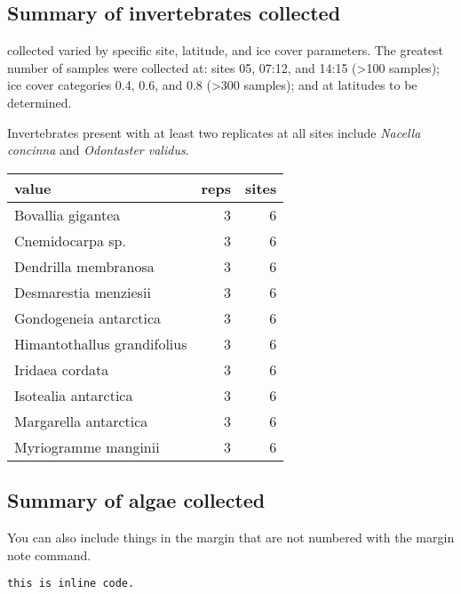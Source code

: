 \documentclass[]{tufte-handout}
\begin{document}
\hypertarget{summary-of-invertebrates-collected}{%
\subsection{Summary of invertebrates
collected}\label{summary-of-invertebrates-collected}}

 collected varied by specific site,
latitude, and ice cover parameters. The greatest number of samples were
collected at: sites 05, 07:12, and 14:15 (\textgreater{}100 samples);
ice cover categories 0.4, 0.6, and 0.8 (\textgreater{}300 samples); and
at latitudes to be determined.

Invertebrates present with at least two replicates at all sites include
\emph{Nacella concinna} and \emph{Odontaster validus}.

\begin{table}[H]
\centering
\begin{tabular}{l|r|r}
\hline
value & reps & sites\\
\hline
Bovallia gigantea & 3 & 6\\
\hline
Cnemidocarpa sp. & 3 & 6\\
\hline
Dendrilla membranosa & 3 & 6\\
\hline
Desmarestia menziesii & 3 & 6\\
\hline
Gondogeneia antarctica & 3 & 6\\
\hline
Himantothallus grandifolius & 3 & 6\\
\hline
Iridaea cordata & 3 & 6\\
\hline
Isotealia antarctica & 3 & 6\\
\hline
Margarella antarctica & 3 & 6\\
\hline
Myriogramme manginii & 3 & 6\\
\hline
\end{tabular}
\end{table}

\hypertarget{summary-of-algae-collected}{%
\subsection{Summary of algae
collected}\label{summary-of-algae-collected}}

You can also include things in the margin that are not numbered with the
margin note command.

\begin{verbatim}
this is inline code.
\end{verbatim}
\end{document}
